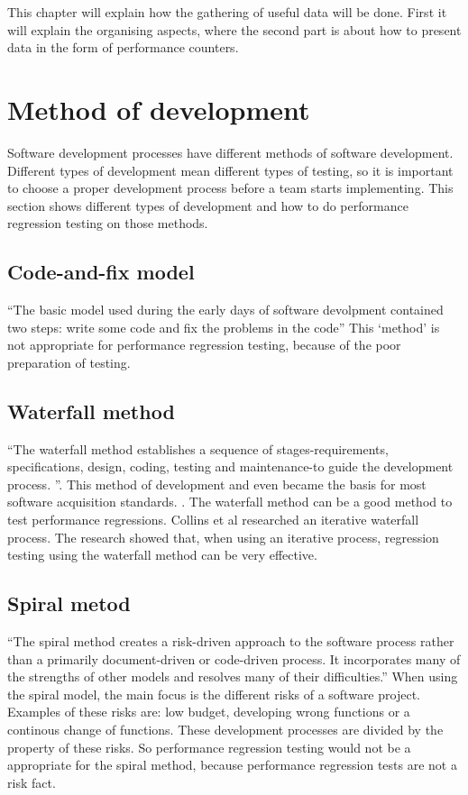 This chapter will explain how the gathering of useful data will be done. First it will explain the organising aspects, where the second part is about how to present data in the form of performance counters.
\section{Method of development}
Software development processes have different methods of software development. Different types of development mean different types of testing, so it is important to choose a proper development process before a team starts implementing. This section shows different types of development and how to do performance regression testing on those methods.
\subsection{Code-and-fix model}
``The basic model used during the early days of software devolpment contained two steps: write some code and fix the problems in the code'' \cite{boehm1988spiral} This `method' is not appropriate for performance regression testing, because of the poor preparation of testing. 

\subsection{Waterfall method}
``The waterfall method establishes a sequence of stages-requirements, specifications, design, coding, testing and maintenance-to guide the development process. ''\cite{kang1989software}. This method of development and even became the basis for most software acquisition standards. \cite{boehm1988spiral}. The waterfall method can be a good method to test performance regressions. Collins et al researched an iterative waterfall process. \cite{collins2010iterative} The research showed that, when using an iterative process, regression testing using the waterfall method can be very effective. 
\subsection{Spiral metod}
``The spiral method creates a risk-driven approach to the software process rather than a primarily document-driven or code-driven process. It incorporates many of the strengths
of other models and resolves many of their
difficulties.''\cite{boehm1988spiral} When using the spiral model, the main focus is the different risks of a software project. Examples of these risks are: low budget, developing wrong functions or a continous change of functions. These development processes are divided by the property of these risks. So performance regression testing would not be a appropriate for the spiral method, because performance regression tests are not a risk fact.  
